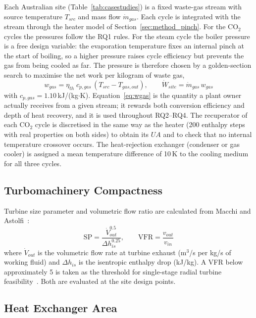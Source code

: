 \documentclass[12pt,a4paper]{report}
\begin{document}
Each Australian site (Table~\ref{tab:casestudies}) is a fixed waste-gas
stream with source temperature $T_{src}$ and mass flow $\dot{m}_{gas}$. Each
cycle is integrated with the stream through the heater model of
Section~\ref{sec:method_pinch}. For the CO$_2$ cycles the pressures follow the
RQ1 rules. For the steam cycle the boiler pressure is a free design variable:
the evaporation temperature fixes an internal pinch at the start of boiling,
so a higher pressure raises cycle efficiency but prevents the gas from being
cooled as far. The pressure is therefore chosen by a golden-section search to
maximise the net work per kilogram of waste gas,
\begin{equation}
w_{gas} = \eta_{th}\; c_{p,gas}\,\left(T_{src} - T_{gas,out}\right),
\qquad \dot{W}_{site} = \dot{m}_{gas}\, w_{gas}
\label{eq:wgas}
\end{equation}
with $c_{p,gas} = 1.10$\,kJ/(kg$\cdot$K). Equation~\eqref{eq:wgas} is the
quantity a plant owner actually receives from a given stream; it rewards
both conversion efficiency and depth of heat recovery, and it is used
throughout RQ2--RQ4. The recuperator of each CO$_2$ cycle is discretised in
the same way as the heater (200 enthalpy steps with real properties on both
sides) to obtain its $UA$ and to check that no internal temperature crossover
occurs. The heat-rejection exchanger (condenser or gas cooler) is assigned a
mean temperature difference of 10\,K to the cooling medium for all three
cycles.

\subsection{Turbomachinery Compactness}

Turbine size parameter and volumetric flow ratio are calculated from
Macchi and Astolfi~\cite{Macchi2017}:
\begin{equation}
\mathrm{SP} = \frac{\dot{V}_{out}^{0.5}}{\Delta h_{is}^{0.25}}, \qquad
\mathrm{VFR} = \frac{v_{out}}{v_{in}}
\label{eq:sp_vfr}
\end{equation}
where $\dot{V}_{out}$ is the volumetric flow rate at turbine exhaust (m$^3$/s
per kg/s of working fluid) and $\Delta h_{is}$ is the isentropic enthalpy
drop (kJ/kg). A VFR below approximately 5 is taken as the threshold for
single-stage radial turbine feasibility~\cite{Macchi2017}. Both are evaluated
at the site design points.

\subsection{Heat Exchanger Area}
\end{document}
